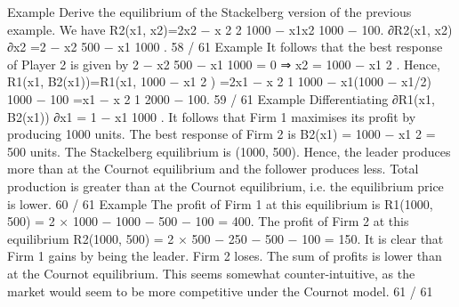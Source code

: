 Example
Derive the equilibrium of the Stackelberg version of the previous
example.
We have
R2(x1, x2)=2x2 −
x
2
2
1000
−
x1x2
1000
− 100.
∂R2(x1, x2)
∂x2
=2 −
x2
500
−
x1
1000
.
58 / 61
Example
It follows that the best response of Player 2 is given by
2 −
x2
500
−
x1
1000
= 0 ⇒ x2 = 1000 −
x1
2
.
Hence,
R1(x1, B2(x1))=R1(x1, 1000 −
x1
2
)
=2x1 −
x
2
1
1000
−
x1(1000 − x1/2)
1000
− 100
=x1 −
x
2
1
2000
− 100.
59 / 61
Example
Differentiating
∂R1(x1, B2(x1))
∂x1
= 1 −
x1
1000
.
It follows that Firm 1 maximises its profit by producing 1000 units.
The best response of Firm 2 is B2(x1) = 1000 −
x1
2 = 500 units.
The Stackelberg equilibrium is (1000, 500). Hence, the leader
produces more than at the Cournot equilibrium and the follower
produces less.
Total production is greater than at the Cournot equilibrium, i.e.
the equilibrium price is lower.
60 / 61
Example
The profit of Firm 1 at this equilibrium is
R1(1000, 500) = 2 × 1000 − 1000 − 500 − 100 = 400.
The profit of Firm 2 at this equilibrium
R2(1000, 500) = 2 × 500 − 250 − 500 − 100 = 150.
It is clear that Firm 1 gains by being the leader. Firm 2 loses. The
sum of profits is lower than at the Cournot equilibrium.
This seems somewhat counter-intuitive, as the market would seem
to be more competitive under the Cournot model.
61 / 61
